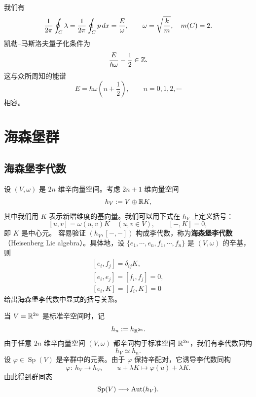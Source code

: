 
我们有
\[
\frac{1}{2\pi}\oint_C \lambda=\frac{1}{2\pi}\oint_C p\,d x=\frac{E}{\omega},
\qquad \omega=\sqrt{\frac{k}{m}},\quad m(C)=2.
\]
凯勒–马斯洛夫量子化条件为
\[
\frac{E}{\hbar\omega}-\frac{1}{2}\in\mathbb{Z}.
\]
这与众所周知的能谱
\[
E=\hbar\omega\left(n+\frac{1}{2}\right),\qquad n=0,1,2,\cdots
\]
相容。


\section{海森堡群}

\subsection{海森堡李代数}

设 $(V,\omega)$ 是 $2n$ 维辛向量空间。考虑 $2n+1$ 维向量空间
\[
h_V:=V\oplus\mathbb{R} K,
\]
其中我们用 $K$ 表示新增维度的基向量。我们可以用下式在 $h_V$ 上定义括号：
\[
[u,v]=\omega(u,v)K\quad (u,v\in V),\qquad [-,K]=0,
\]
即 $K$ 是中心元。
容易验证 $(h_V,[-,-])$ 构成李代数，称为\textbf{海森堡李代数}（Heisenberg Lie algebra）。具体地，设 $\{e_1,\cdots,e_n,f_1,\cdots,f_n\}$ 是 $(V,\omega)$ 的辛基，则
\[
\begin{gathered}
[e_i,f_j]=\delta_{ij}K,\\
[e_i,e_j]=[f_i,f_j]=0,\\
[e_i,K]=[f_i,K]=0
\end{gathered}
\]
给出海森堡李代数中显式的括号关系。

当 $V=\mathbb{R}^{2n}$ 是标准辛空间时，记
\[
h_n:=h_{\mathbb{R}^{2n}}.
\]
由于任意 $2n$ 维辛向量空间 $(V,\omega)$ 都辛同构于标准空间 $\mathbb{R}^{2n}$，我们有李代数同构
\[
h_V\simeq h_n.
\]
设 $\varphi\in\operatorname{Sp}(V)$ 是辛群中的元素。由于 $\varphi$ 保持辛配对，它诱导李代数同构
\[
\varphi:\ h_V\longrightarrow h_V,\qquad
u+\lambda K\longmapsto \varphi(u)+\lambda K.
\]
由此得到群同态
\[
\operatorname{Sp}(V)\longrightarrow \operatorname{Aut}(h_V).
\]

